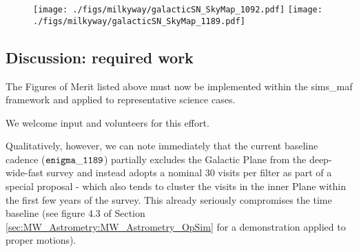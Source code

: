 \begin{figure}
\begin{center}
  \texttt{[image: ./figs/milkyway/galacticSN\_SkyMap\_1092.pdf]}
  \texttt{[image: ./figs/milkyway/galacticSN\_SkyMap\_1189.pdf]}
  \caption{}
\end{center}
\label{f_opSim_GalacticSN}
\end{figure}








\subsection{Discussion: required work}
\label{sec:\secname:MW_Disk_discussion}

The Figures of Merit listed above must now be implemented within the
sims\_maf framework and applied to representative science
cases. 

We welcome input and volunteers for this effort. 

Qualitatively, however, we can note immediately that the current
baseline cadence (${\tt enigma\_1189}$) partially excludes the
Galactic Plane from the deep-wide-fast survey and instead adopts a
nominal 30 visits per filter as part of a special proposal - which
also tends to cluster the visits in the inner Plane within the first
few years of the survey. This already seriously compromises the time
baseline (see figure 4.3 of Section
\ref{sec:MW_Astrometry:MW_Astrometry_OpSim} for a demonstration applied to
proper motions).

